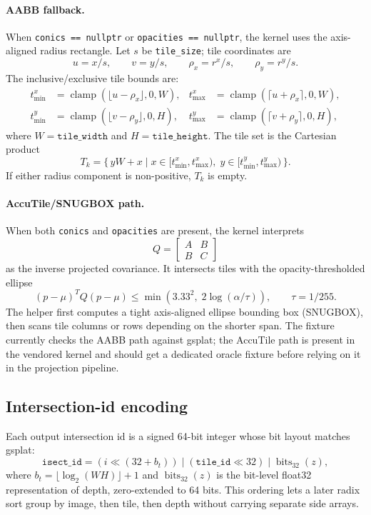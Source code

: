 \documentclass[11pt]{article}
\begin{document}
\paragraph{AABB fallback.}
When \texttt{conics == nullptr} or \texttt{opacities == nullptr}, the
kernel uses the axis-aligned radius rectangle. Let $s$ be
\texttt{tile\_size}; tile coordinates are
\[
  u = x/s, \qquad v = y/s, \qquad
  \rho_x = r^x/s, \qquad \rho_y = r^y/s.
\]
The inclusive/exclusive tile bounds are:
\[
\begin{aligned}
  t^x_{\min} &= \operatorname{clamp}(\lfloor u-\rho_x \rfloor, 0, W), &
  t^x_{\max} &= \operatorname{clamp}(\lceil u+\rho_x \rceil, 0, W),\\
  t^y_{\min} &= \operatorname{clamp}(\lfloor v-\rho_y \rfloor, 0, H), &
  t^y_{\max} &= \operatorname{clamp}(\lceil v+\rho_y \rceil, 0, H),
\end{aligned}
\]
where $W=\texttt{tile\_width}$ and $H=\texttt{tile\_height}$. The tile
set is the Cartesian product
\[
  T_k =
  \{\, yW+x \mid
      x \in [t^x_{\min},t^x_{\max}),\;
      y \in [t^y_{\min},t^y_{\max}) \,\}.
\]
If either radius component is non-positive, $T_k$ is empty.

\paragraph{AccuTile/SNUGBOX path.}
When both \texttt{conics} and \texttt{opacities} are present, the
kernel interprets
\[
  Q =
  \begin{bmatrix}
    A & B\\
    B & C
  \end{bmatrix}
\]
as the inverse projected covariance. It intersects tiles with the
opacity-thresholded ellipse
\[
  (p-\mu)^T Q (p-\mu) \le
  \min\!\left(3.33^2,\; 2\log(\alpha / \tau)\right),
  \qquad \tau = 1/255.
\]
The helper first computes a tight axis-aligned ellipse bounding box
(SNUGBOX), then scans tile columns or rows depending on the shorter
span. The fixture currently checks the AABB path against gsplat; the
AccuTile path is present in the vendored kernel and should get a
dedicated oracle fixture before relying on it in the projection
pipeline.

\subsection{Intersection-id encoding}

Each output intersection id is a signed 64-bit integer whose bit
layout matches gsplat:
\[
  \texttt{isect\_id}
  =
  (i \ll (32 + b_t))
  \;|\;
  (\texttt{tile\_id} \ll 32)
  \;|\;
  \operatorname{bits}_{32}(z),
\]
where $b_t = \lfloor \log_2(W H) \rfloor + 1$ and
$\operatorname{bits}_{32}(z)$ is the bit-level float32 representation
of depth, zero-extended to 64 bits. This ordering lets a later radix
sort group by image, then tile, then depth without carrying separate
side arrays.
\end{document}
